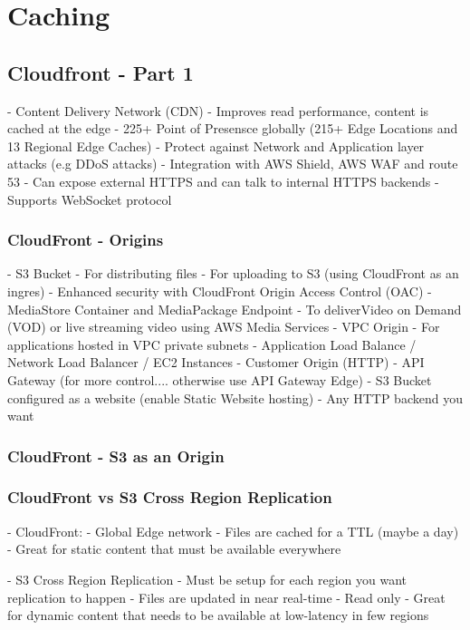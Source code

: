 \documentclass[11pt]{book}
\begin{document}
    \chapter{Caching}


    \section{Cloudfront - Part 1}
    - Content Delivery Network (CDN)
    - Improves read performance, content is cached at the edge
    - 225+ Point of Presensce globally (215+ Edge Locations and 13 Regional Edge Caches)
    - Protect against Network and Application layer attacks (e.g DDoS attacks)
    - Integration with AWS Shield, AWS WAF and route 53
    - Can expose external HTTPS and can talk to internal HTTPS backends
    - Supports WebSocket protocol

    \subsection{CloudFront - Origins}
    - S3 Bucket
    - For distributing files
    - For uploading to S3 (using CloudFront as an ingres)
    - Enhanced security with CloudFront Origin Access Control (OAC)
    - MediaStore Container and MediaPackage Endpoint
    - To deliverVideo on Demand (VOD) or live streaming video using AWS Media Services
    - VPC Origin
    - For applications hosted in VPC private subnets
    - Application Load Balance / Network Load Balancer / EC2 Instances
    - Customer Origin (HTTP)
    - API Gateway (for more control.... otherwise use API Gateway Edge)
    - S3 Bucket configured as a website (enable Static Website hosting)
    - Any HTTP backend you want

    \subsection{CloudFront - S3 as an Origin}

    \subsection{CloudFront vs S3 Cross Region Replication}
    - CloudFront:
    - Global Edge network
    - Files are cached for a TTL (maybe a day)
    - Great for static content that must be available everywhere

    - S3 Cross Region Replication
    - Must be setup for each region you want replication to happen
    - Files are updated in near real-time
    - Read only
    - Great for dynamic content that needs to be available at low-latency in few regions
\end{document}

